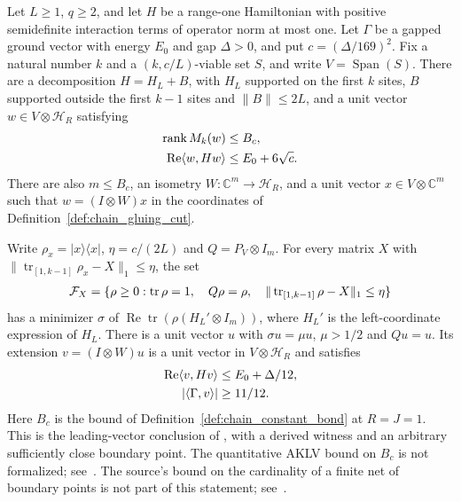 \begin{lemma}
    \label{thm:lvv_viable_leading_vector_library_bond}
    \leanok
    Let $L\ge1$, $q\ge2$, and let $H$ be a range-one Hamiltonian with
    positive semidefinite interaction terms of operator norm at most one.
    Let $\Gamma$ be a gapped ground vector with energy $E_0$ and gap
    $\Delta>0$, and put $c=(\Delta/169)^2$. Fix a natural number $k$ and a
    $(k,c/L)$-viable set $S$, and write $V=\operatorname{Span}(S)$.
    There are a decomposition $H=H_L+B$, with $H_L$ supported on the first
    $k$ sites, $B$ supported outside the first $k-1$ sites and
    $\|B\|\le2L$, and a unit vector $w\in V\otimes\mathcal H_R$ satisfying
    \begin{align}
        \operatorname{rank}M_k(w)            & \le B_c,\notag          \\
        \operatorname{Re}\langle w,Hw\rangle & \le E_0+6\sqrt c.\notag
    \end{align}
    There are also $m\le B_c$, an isometry
    $W:\mathbb C^m\to\mathcal H_R$, and a unit vector
    $x\in V\otimes\mathbb C^m$ such that $w=(I\otimes W)x$ in the
    coordinates of Definition~\ref{def:chain_gluing_cut}.

    Write $\rho_x=|x\rangle\langle x|$, $\eta=c/(2L)$ and
    $Q=P_V\otimes I_m$. For every matrix $X$ with
    $\|\operatorname{tr}_{[1,k-1]}\rho_x-X\|_1\le\eta$, the set
    \begin{align}
        \mathcal F_X=\{\rho\ge0:\operatorname{tr}\rho=1,\quad
        Q\rho=\rho,\quad
        \|\operatorname{tr}_{[1,k-1]}\rho-X\|_1\le\eta\}\notag
    \end{align}
    has a minimizer $\sigma$ of
    $\operatorname{Re}\operatorname{tr}(\rho(H_L'\otimes I_m))$, where
    $H_L'$ is the left-coordinate expression of $H_L$.
    There is a unit vector $u$ with $\sigma u=\mu u$, $\mu>1/2$ and $Qu=u$.
    Its extension $v=(I\otimes W)u$ is a unit vector in
    $V\otimes\mathcal H_R$ and satisfies
    \begin{align}
        \operatorname{Re}\langle v,Hv\rangle & \le E_0+\Delta/12,\notag \\
        |\langle\Gamma,v\rangle|             & \ge11/12.\notag
    \end{align}
    Here $B_c$ is the bound of Definition~\ref{def:chain_constant_bond}
    at $R=J=1$. This is the leading-vector conclusion of
    \cite[Lemma~2.5, source lines 493--505]{Landau2015Polynomial}, with a
    derived witness and an arbitrary sufficiently close boundary point.
    The quantitative AKLV bound on $B_c$ is not formalized;
    see~\cite{gap:lvv13_constant_bond}. The source's bound on the
    cardinality of a finite net of boundary points is not part of this
    statement; see~\cite{gap:lvv13_leading_net_point}.
\end{lemma}
